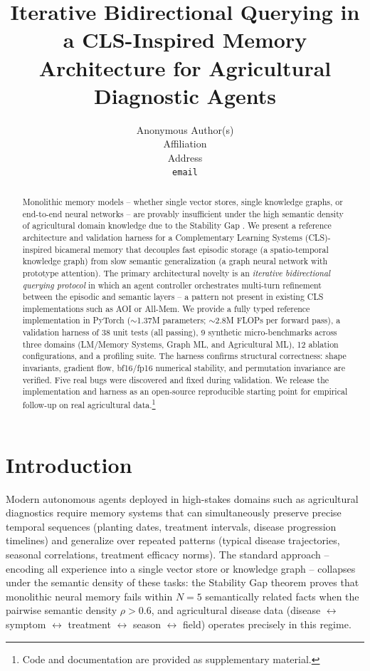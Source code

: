 \documentclass{article}
\title{Iterative Bidirectional Querying in a CLS-Inspired Memory Architecture
       for Agricultural Diagnostic Agents}
\author{%
  Anonymous Author(s) \\
  Affiliation \\
  Address \\
  \texttt{email} \\
}
\begin{document}
\maketitle

\begin{abstract}
Monolithic memory models -- whether single vector stores, single knowledge graphs,
or end-to-end neural networks -- are provably insufficient under the high semantic
density of agricultural domain knowledge due to the Stability Gap
\citep{stabilitygap2026}. We present a reference architecture and validation harness
for a Complementary Learning Systems (CLS)-inspired bicameral memory that decouples
fast episodic storage (a spatio-temporal knowledge graph) from slow semantic
generalization (a graph neural network with prototype attention). The primary
architectural novelty is an \emph{iterative bidirectional querying protocol} in
which an agent controller orchestrates multi-turn refinement between the episodic
and semantic layers -- a pattern not present in existing CLS implementations such
as AOI or All-Mem. We provide a fully typed reference implementation in PyTorch
($\sim$1.37M parameters; $\sim$2.8M FLOPs per forward pass), a validation harness
of 38 unit tests (all passing), 9 synthetic micro-benchmarks across three domains
(LM/Memory Systems, Graph ML, and Agricultural ML), 12 ablation configurations,
and a profiling suite. The harness confirms structural correctness: shape
invariants, gradient flow, bf16/fp16 numerical stability, and permutation
invariance are verified. Five real bugs were discovered and fixed during
validation. We release the implementation and harness as an open-source
reproducible starting point for empirical follow-up on real agricultural data.\footnote{%
  Code and documentation are provided as supplementary material.}
\end{abstract}

\section{Introduction}

Modern autonomous agents deployed in high-stakes domains such as agricultural
diagnostics require memory systems that can simultaneously preserve precise
temporal sequences (planting dates, treatment intervals, disease progression
timelines) and generalize over repeated patterns (typical disease trajectories,
seasonal correlations, treatment efficacy norms). The standard approach --
encoding all experience into a single vector store or knowledge graph --
collapses under the semantic density of these tasks: the Stability Gap theorem
\citep{stabilitygap2026} proves that monolithic neural memory fails within
$N = 5$ semantically related facts when the pairwise semantic density
$\rho > 0.6$, and agricultural disease data (disease $\leftrightarrow$ symptom
$\leftrightarrow$ treatment $\leftrightarrow$ season $\leftrightarrow$ field)
operates precisely in this regime.
\end{document}
